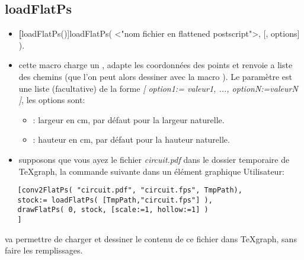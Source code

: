 \subsection{loadFlatPs}\label{macloadFlatPs}
\begin{itemize}
 \item \util \textbf[loadFlatPs()]{loadFlatPs( <"nom fichier en flattened postscript">, [, options] )}.
 \item \desc cette macro charge un , adapte les coordonnées des points et renvoie  a liste des chemins (que l'on peut alors dessiner avec la macro ). Le paramètre  est une liste (facultative) de la forme \textsl{[ option1:= valeur1, ..., optionN:=valeurN ]}, les options sont:
  \begin{itemize}
  \item {}: largeur en cm, \Nil par défaut pour la largeur naturelle.
  \item {}: hauteur en cm, \Nil par défaut pour la hauteur naturelle.
  \end{itemize}
 \item supposons que vous ayez le fichier \textit{circuit.pdf} dans le dossier temporaire de TeXgraph, la commande suivante dans un élément graphique Utilisateur:
\end{itemize}

\begin{verbatim}
   [conv2FlatPs( "circuit.pdf", "circuit.fps", TmpPath),
   stock:= loadFlatPs( [TmpPath,"circuit.fps"] ),
   drawFlatPs( 0, stock, [scale:=1, hollow:=1] )
   ]
\end{verbatim}

va permettre de charger et dessiner le contenu de ce fichier dans TeXgraph, sans faire les remplissages.


